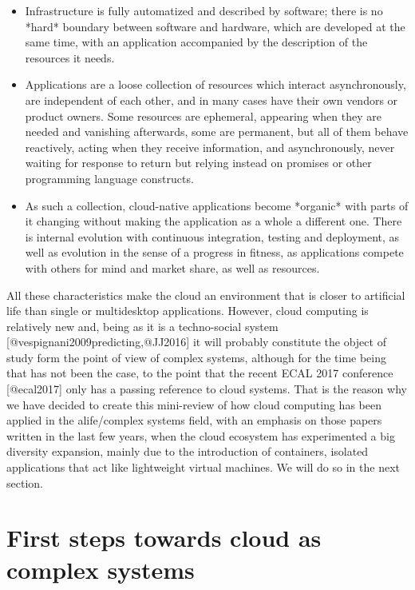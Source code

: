 \documentclass[utf8]{frontiersSCNS} %
\begin{document}
\begin{itemize}

\item Infrastructure is fully automatized and described by software; there is no *hard* boundary between software and hardware, which are developed at the same time, with an application accompanied by the description of the resources it needs. 

\item  Applications are a loose collection of resources which interact asynchronously, are independent of each other, and in many cases have their own vendors or product owners. Some resources are ephemeral, appearing when they are needed and vanishing afterwards, some are permanent, but all of them behave reactively, acting when they receive information, and asynchronously, never waiting for response to return but relying instead on promises or other programming language constructs.

\item  As such a collection, cloud-native applications become *organic*
  with parts of it changing without making the application as a whole
  a different one. There is internal evolution with continuous
  integration, testing and deployment, as well as evolution in the
  sense of a progress in fitness, as applications compete with others
  for mind and market share, as well as resources. 
\end{itemize}

All these characteristics make the cloud an environment that is closer
to artificial life than single or multidesktop applications. However,
cloud computing is relatively new and, being as it is a techno-social
system [@vespignani2009predicting,@JJ2016] it will probably constitute
the object of study form the point of view of complex systems,
although for the time being that has not been the case, to the point
that the recent ECAL 2017 conference [@ecal2017] only has a passing reference to
cloud systems. That is the reason why we have decided to create this
mini-review of how cloud computing has been applied in the
alife/complex systems field, with an emphasis on those papers written
in the last few years, when the cloud ecosystem has experimented a big
diversity expansion, mainly due to the introduction of containers,
isolated applications that act like lightweight virtual machines. We
will do so in the next section.

\section{First steps towards cloud as complex systems}
\end{document}
